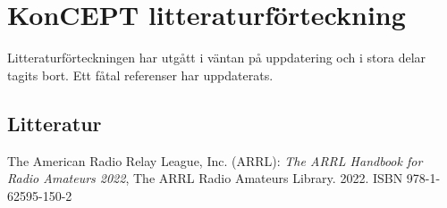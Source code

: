 \onecolumn
\chapter{KonCEPT litteraturförteckning}
\label{konceptlitteratur}

Litteraturförteckningen har utgått i väntan på uppdatering och i stora delar
tagits bort.  Ett fåtal referenser har uppdaterats. 

\section{Litteratur}

The American Radio Relay League, Inc. (ARRL):
\emph{The ARRL Handbook for Radio Amateurs 2022},
The ARRL Radio Amateurs Library. 2022. ISBN 978-1-62595-150-2

\twocolumn









